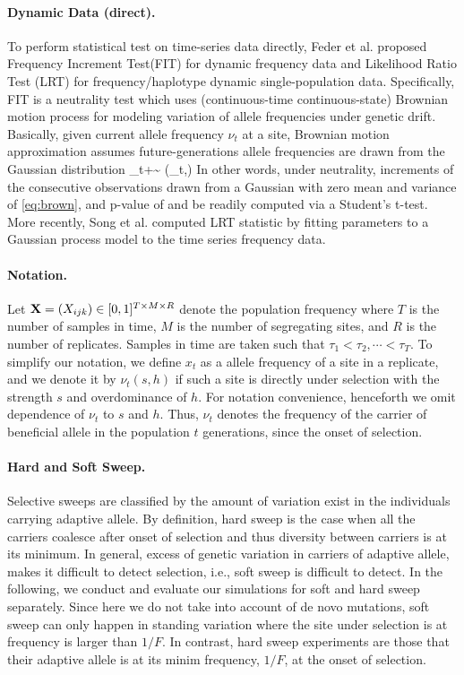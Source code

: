 \documentclass[11pt]{article}
\begin{document}
\paragraph{Dynamic Data (direct).} To perform statistical test on time-series 
data directly, 
Feder et al. \cite{feder2014Identifying} proposed Frequency Increment
Test(FIT) for dynamic frequency data and Likelihood Ratio Test (LRT) for 
frequency/haplotype dynamic single-population data.
Specifically, FIT is a neutrality test which uses (continuous-time 
continuous-state) Brownian motion process for modeling variation of 
 allele frequencies under genetic drift. 
 Basically, given current allele frequency 
 $\nu_t$ at a site, Brownian motion approximation assumes 
 future-generations allele 
 frequencies are drawn from the Gaussian distribution
 \beq
 \nu_{t+\tau}\sim 
 \Nc\left(\nu_t,\tau\right) 
 \label{eq:brown}
 \eeq
 In other words, under neutrality, increments of the consecutive observations 
 drawn from a Gaussian with 
 zero mean and variance of \eqref{eq:brown}, and p-value of and be readily 
 computed via a Student's t-test. More recently, Song et al. 
 \cite{Terhorst2015Multi} computed LRT statistic by fitting 
 parameters to a Gaussian process model to the time series frequency data. 


\paragraph{Notation.} Let ${\mathbf X} = (X_{ijk}) \in [0, 1]^{T \times 
M\times R}$ denote the population frequency where $T$ is the number of samples 
in time, $M$ is the number of segregating sites, and $R$ is the number of 
replicates. Samples in time are taken such that $\tau_1<\tau_2,\cdots<\tau_T$.
To simplify our notation, we define $x_t$ as a allele frequency of a site in a
 replicate, and we denote it by $\nu_t(s,h)$ if such a site is directly 
 under 
 selection with the strength $s$ and overdominance of $h$. For 
 notation 
 convenience, henceforth we omit dependence of $\nu_t$ to $s$ and 
 $h$. 
 Thus, $\nu_t$ denotes the frequency of 
 the carrier of beneficial allele in the population $t$ generations, since the 
 onset of selection.


\paragraph{Hard and Soft Sweep.}
Selective sweeps are classified by the amount of 
variation exist in the individuals carrying adaptive allele. By definition, 
hard sweep is the case when all the carriers coalesce after onset of selection 
and thus diversity between carriers is at its minimum. 
In general, excess of genetic variation in carriers of adaptive allele, makes 
it difficult to detect selection, i.e., soft sweep is difficult to detect. 
In the following, we conduct and evaluate our simulations for soft and hard 
sweep separately. Since here we do not take into account of de novo mutations, 
soft sweep can only happen in standing variation 
where the site under selection is at frequency is larger than $1/F$. In 
contrast, hard sweep experiments are those that their adaptive allele is at its 
minim frequency, $1/F$, at the onset of selection.
\end{document}

